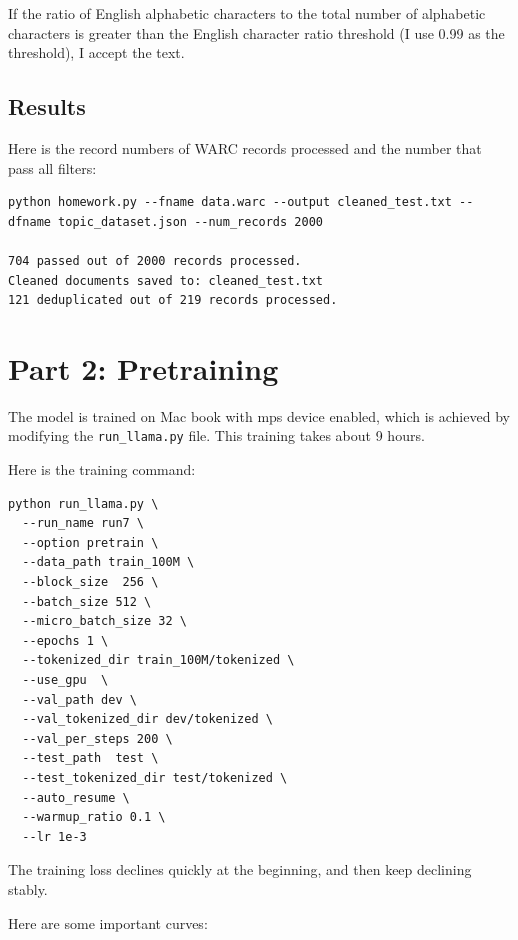 \documentclass[11pt,a4paper]{article}
\begin{document}
If the ratio of English alphabetic characters to the total number of alphabetic characters is greater than the English character ratio threshold (I use 0.99 as the threshold), I accept the text.

\subsection{Results}

Here is the record numbers of WARC records processed and the number that pass all filters:


\begin{lstlisting}
python homework.py --fname data.warc --output cleaned_test.txt --dfname topic_dataset.json --num_records 2000

704 passed out of 2000 records processed.
Cleaned documents saved to: cleaned_test.txt
121 deduplicated out of 219 records processed.
\end{lstlisting}

\section{Part 2: Pretraining}

The model is trained on Mac book with mps device enabled, which is achieved by modifying the \texttt{run\_llama.py} file. This training takes about 9 hours.

Here is the training command:
\begin{lstlisting}
python run_llama.py \
  --run_name run7 \
  --option pretrain \
  --data_path train_100M \
  --block_size  256 \
  --batch_size 512 \
  --micro_batch_size 32 \
  --epochs 1 \
  --tokenized_dir train_100M/tokenized \
  --use_gpu  \
  --val_path dev \
  --val_tokenized_dir dev/tokenized \
  --val_per_steps 200 \
  --test_path  test \
  --test_tokenized_dir test/tokenized \
  --auto_resume \
  --warmup_ratio 0.1 \
  --lr 1e-3 
\end{lstlisting}

The training loss declines quickly at the beginning, and then keep declining stably.

Here are some important curves:
\end{document}
